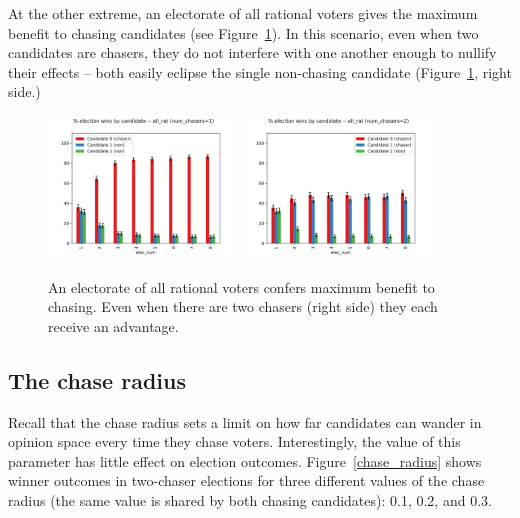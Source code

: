 At the other extreme, an electorate of all rational voters gives the maximum
benefit to chasing candidates (see Figure~\ref{all_rat_chasers_benefit}). In
this scenario, even when two candidates are chasers, they do not interfere with
one another enough to nullify their effects -- both easily eclipse the single
non-chasing candidate (Figure~\ref{all_rat_chasers_benefit}, right side.)

\begin{figure}[ht]
\centering
\includegraphics[width=0.45\textwidth]{assets/all_rat_one_chaser_even_bigger_benefit.png}
\includegraphics[width=0.45\textwidth]{assets/all_rat_two_chasers_even_bigger_benefit.png}
\caption{An electorate of all rational voters confers maximum benefit to
chasing. Even when there are two chasers (right side) they each receive an
advantage.}
\label{all_rat_chasers_benefit}
\end{figure}


\subsection{The chase radius}

Recall that the chase radius sets a limit on how far candidates can wander in
opinion space every time they chase voters. Interestingly, the value of this
parameter has little effect on election outcomes. Figure~\ref{chase_radius}
shows winner outcomes in two-chaser elections for three different values of the
chase radius (the same value is shared by both chasing candidates): 0.1, 0.2,
and 0.3.

